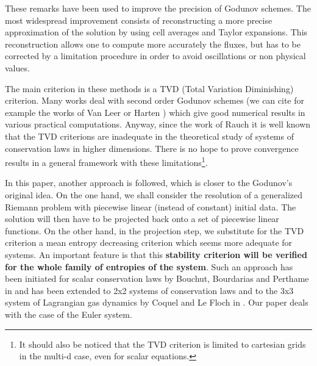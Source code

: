 \documentclass{fldauth}
\theoremstyle{plain}
\theoremstyle{plain}
\theoremstyle{plain}
\theoremstyle{plain}
\theoremstyle{plain}
\theoremstyle{plain}
\begin{document}
These remarks have been used to improve the precision of Godunov schemes. The
most widespread improvement consists of reconstructing a more precise approximation
of the solution by using cell averages and Taylor expansions. This reconstruction
allows one to compute more accurately the fluxes, but has to be corrected by
a limitation procedure in order to avoid oscillations or non physical values.

The main criterion in these methods is a TVD (Total Variation
Diminishing) criterion. Many works deal with second order Godunov
schemes (we can cite for example the works of Van Leer
\cite{vanleer79} or Harten \cite{harten_osher82}) which give good
numerical results in various practical computations. Anyway, since
the work of Rauch \cite{rauch86} it is well known that the TVD
criterions are inadequate in the theoretical study of systems of
conservation laws in higher dimensions. There is no hope to prove
convergence results in a general framework with these
limitations\footnote{It should also be noticed that the TVD
criterion is limited to cartesian grids in the multi-d case, even
for scalar equations.}.

In this paper, another approach is followed, which is closer to
the Godunov's original idea. On the one hand, we shall consider
the resolution of a generalized Riemann problem with piecewise
linear (instead of constant) initial data. The solution will then
have to be projected back onto a set of piecewise linear
functions. On the other hand, in the projection step, we
substitute for the TVD criterion a mean entropy decreasing
criterion which seems more adequate for systems. An important
feature is that this \textbf{stability criterion will be verified
for the whole family of entropies of the system}. Such an approach
has been initiated for scalar conservation laws by Bouchut,
Bourdarias and Perthame in \cite{bouchut_pertham93} and has been
extended to 2x2 systems of conservation laws and to the 3x3 system
of Lagrangian gas dynamics by Coquel and Le Floch in
\cite{coquel_lefloch95}. Our paper deals with the case of the
Euler system.
\end{document}
